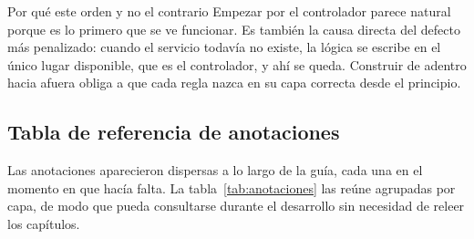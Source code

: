 \documentclass[11pt,a4paper,openany]{book}
\begin{document}
\begin{cajabuenas}{Por qué este orden y no el contrario}
	Empezar por el controlador parece natural porque es lo primero que se ve funcionar. Es también la causa directa del defecto más penalizado: cuando el servicio todavía no existe, la lógica se escribe en el único lugar disponible, que es el controlador, y ahí se queda. Construir de adentro hacia afuera obliga a que cada regla nazca en su capa correcta desde el principio.
\end{cajabuenas}

\subsection{Tabla de referencia de anotaciones}
\label{sec:tabla-anotaciones}

Las anotaciones aparecieron dispersas a lo largo de la guía, cada una en el momento en que hacía falta. La tabla~\ref{tab:anotaciones} las reúne agrupadas por capa, de modo que pueda consultarse durante el desarrollo sin necesidad de releer los capítulos.
\end{document}
